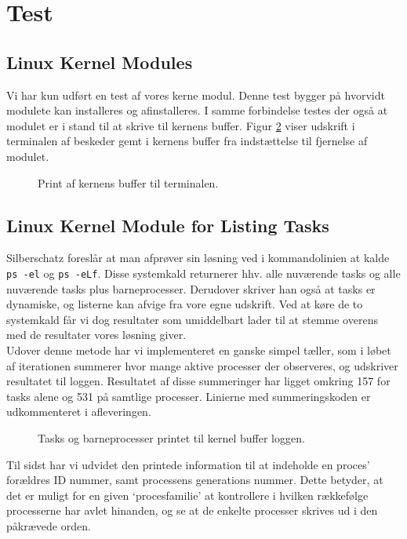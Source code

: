 \documentclass[main.tex]{subfile}
\begin{document}
\section{Test}
\subsection{Linux Kernel Modules}
Vi har kun udført en test af vores kerne modul. Denne test bygger på hvorvidt modulete kan installeres og afinstalleres. I samme forbindelse testes der også at modulet er i stand til at skrive til kernens buffer. Figur \ref{fig:part1_dmesg} viser udskrift i terminalen af beskeder gemt i kernens buffer fra indstættelse til fjernelse af modulet.
\begin{figure}[H]
\center
{}
\caption{Print af kernens buffer til terminalen.}
\label{fig:part1_dmesg}
\end{figure}

\subsection{Linux Kernel Module for Listing Tasks}
Silberschatz foreslår at man afprøver sin løsning ved i kommandolinien at kalde \texttt{ps -el} og \texttt{ps -eLf}. Disse systemkald returnerer hhv. alle nuværende tasks og alle nuværende tasks plus barneprocesser. Derudover skriver han også at tasks er dynamiske, og listerne kan afvige fra vore egne udskrift. Ved at køre de to systemkald får vi dog resultater som umiddelbart lader til at stemme overens med de resultater vores løsning giver.\\

Udover denne metode har vi implementeret en ganske simpel tæller, som i løbet af iterationen summerer hvor mange aktive processer der observeres, og udskriver resultatet til loggen. Resultatet af disse summeringer har ligget omkring 157 for tasks alene og 531 på samtlige processer. Linierne med summeringskoden er udkommenteret i afleveringen.\\

\begin{figure}[H]
\center
{}
\caption{Tasks og barneprocesser printet til kernel buffer loggen.}
\label{fig:part1_dmesg}
\end{figure}

Til sidst har vi udvidet den printede information til at indeholde en proces’ forældres ID nummer, samt processens generations nummer. Dette betyder, at det er muligt for en given ‘procesfamilie’ at kontrollere i hvilken rækkefølge processerne har avlet hinanden, og se at de enkelte processer skrives ud i den påkrævede orden.
\end{document}
